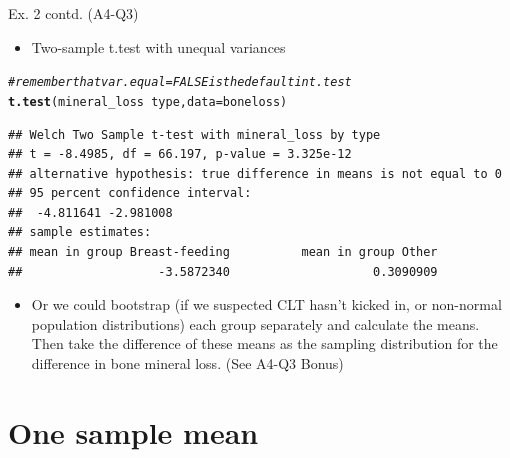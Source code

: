 \documentclass{beamer}\usepackage[]{graphicx}\usepackage[]{color}
\newcommand{\hlcom}[1]{\textcolor[rgb]{0.678,0.584,0.686}{\textit{#1}}}%
\newcommand{\hlopt}[1]{\textcolor[rgb]{0,0,0}{#1}}%
\newcommand{\hlstd}[1]{\textcolor[rgb]{0.345,0.345,0.345}{#1}}%
\newcommand{\hlkwc}[1]{\textcolor[rgb]{0.333,0.667,0.333}{#1}}%
\newcommand{\hlkwd}[1]{\textcolor[rgb]{0.737,0.353,0.396}{\textbf{#1}}}%
\newenvironment{knitrout}{}{} %
\begin{document}
\begin{frame}[fragile]{Ex. 2 contd. (A4-Q3)}
\begin{itemize}
	\small
	\setlength\itemsep{1em}
	\item  Two-sample t.test with unequal variances
\end{itemize}

\begin{knitrout}\tiny
{}\color{fgcolor}
\begin{alltt}
\hlcom{# remember that var.equal=FALSE is the default in t.test }
\hlkwd{t.test}\hlstd{(mineral_loss} \hlopt{~} \hlstd{type,} \hlkwc{data} \hlstd{= boneloss)}
\end{alltt}
\begin{verbatim}
## Welch Two Sample t-test with mineral_loss by type 
## t = -8.4985, df = 66.197, p-value = 3.325e-12
## alternative hypothesis: true difference in means is not equal to 0 
## 95 percent confidence interval:
##  -4.811641 -2.981008 
## sample estimates:
## mean in group Breast-feeding          mean in group Other 
##                   -3.5872340                    0.3090909
\end{verbatim}

\end{knitrout}

\pause 
\begin{itemize}
	\small
	\setlength\itemsep{1em}
	\item  Or we could bootstrap (if we suspected CLT hasn't kicked in, or non-normal population distributions) each group separately and calculate the means. Then take the difference of these means as the sampling distribution for the difference in bone mineral loss. (See A4-Q3 Bonus)
\end{itemize}

\end{frame}





\section{One sample mean}
\end{document}
